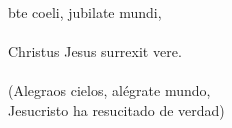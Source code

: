 \begin{cancion}%
	bte coeli, jubilate mundi,\\
	\jump\\
Christus Jesus surrexit vere.\\
	\jump\\
(Alegraos cielos, alégrate mundo,\\
 Jesucristo ha resucitado de verdad)\\
\end{cancion}%
